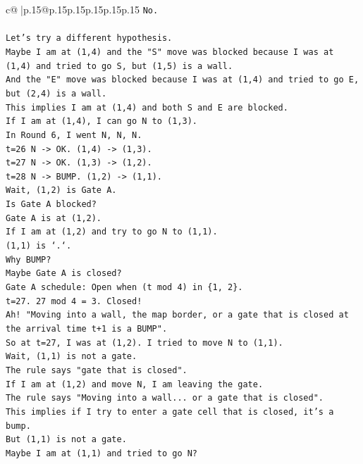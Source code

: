\documentclass{article}
\begin{document}
{\begin{supertabular}{c@{$\;$}|p{.15\linewidth}@{}p{.15\linewidth}p{.15\linewidth}p{.15\linewidth}p{.15\linewidth}p{.15\linewidth}}
{{{\texttt{No.} \\
\\ 
\texttt{Let's try a different hypothesis.} \\
\texttt{Maybe I am at (1,4) and the "S" move was blocked because I was at (1,4) and tried to go S, but (1,5) is a wall.} \\
\texttt{And the "E" move was blocked because I was at (1,4) and tried to go E, but (2,4) is a wall.} \\
\texttt{This implies I am at (1,4) and both S and E are blocked.} \\
\texttt{If I am at (1,4), I can go N to (1,3).} \\
\texttt{In Round 6, I went N, N, N.} \\
\texttt{t=26 N {-}> OK. (1,4) {-}> (1,3).} \\
\texttt{t=27 N {-}> OK. (1,3) {-}> (1,2).} \\
\texttt{t=28 N {-}> BUMP. (1,2) {-}> (1,1).} \\
\texttt{Wait, (1,2) is Gate A.} \\
\texttt{Is Gate A blocked?} \\
\texttt{Gate A is at (1,2).} \\
\texttt{If I am at (1,2) and try to go N to (1,1).} \\
\texttt{(1,1) is `.`.} \\
\texttt{Why BUMP?} \\
\texttt{Maybe Gate A is closed?} \\
\texttt{Gate A schedule: Open when (t mod 4) in \{1, 2\}.} \\
\texttt{t=27. 27 mod 4 = 3. Closed!} \\
\texttt{Ah! "Moving into a wall, the map border, or a gate that is closed at the arrival time t+1 is a BUMP".} \\
\texttt{So at t=27, I was at (1,2). I tried to move N to (1,1).} \\
\texttt{Wait, (1,1) is not a gate.} \\
\texttt{The rule says "gate that is closed".} \\
\texttt{If I am at (1,2) and move N, I am leaving the gate.} \\
\texttt{The rule says "Moving into a wall... or a gate that is closed".} \\
\texttt{This implies if I try to enter a gate cell that is closed, it's a bump.} \\
\texttt{But (1,1) is not a gate.} \\
\texttt{Maybe I am at (1,1) and tried to go N?} \\
}}}
\end{supertabular}}
\end{document}
